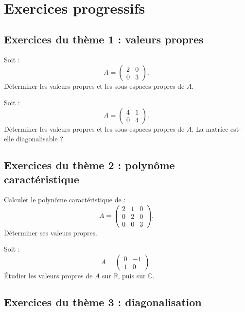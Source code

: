 \documentclass[11pt,a4paper]{article}
\newcommand{\R}{\mathbb R}
\newcommand{\C}{\mathbb C}
\begin{document}
\section{Exercices progressifs}

\subsection*{Exercices du thème 1 : valeurs propres}

\begin{exercicebox}[1]
Soit :
\[
A=
\begin{pmatrix}
2&0\\
0&3
\end{pmatrix}.
\]
Déterminer les valeurs propres et les sous-espaces propres de \(A\).
\end{exercicebox}

\begin{exercicebox}[2]
Soit :
\[
A=
\begin{pmatrix}
4&1\\
0&4
\end{pmatrix}.
\]
Déterminer les valeurs propres et les sous-espaces propres de \(A\).  
La matrice est-elle diagonalisable ?
\end{exercicebox}

\subsection*{Exercices du thème 2 : polynôme caractéristique}

\begin{exercicebox}[3]
Calculer le polynôme caractéristique de :
\[
A=
\begin{pmatrix}
2&1&0\\
0&2&0\\
0&0&3
\end{pmatrix}.
\]
Déterminer ses valeurs propres.
\end{exercicebox}

\begin{exercicebox}[4]
Soit :
\[
A=
\begin{pmatrix}
0&-1\\
1&0
\end{pmatrix}.
\]
Étudier les valeurs propres de \(A\) sur \(\R\), puis sur \(\C\).
\end{exercicebox}

\subsection*{Exercices du thème 3 : diagonalisation}
\end{document}
